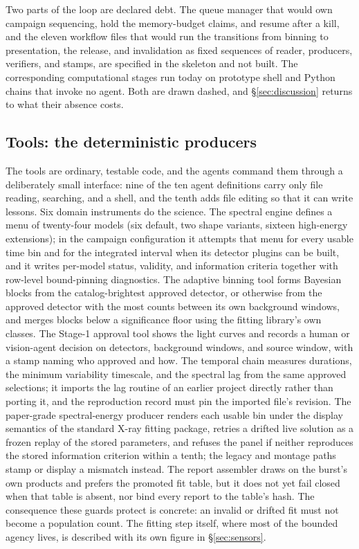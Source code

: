 Two parts of the loop are declared debt. The queue manager that would own
campaign sequencing, hold the memory-budget claims, and resume after a
kill, and the eleven workflow files\prov{} that would run the transitions
from binning to presentation, the release, and invalidation as fixed
sequences of reader, producers, verifiers, and stamps, are specified in the
skeleton and not built. The corresponding computational stages run today on
prototype shell and Python chains that invoke no agent. Both are drawn
dashed, and \S\ref{sec:discussion} returns to what their absence costs.

\subsection{Tools: the deterministic producers} \label{sec:tools}

The tools are ordinary, testable code, and the agents command them through
a deliberately small interface: nine of the ten agent definitions carry only
file reading, searching, and a shell, and the tenth adds file editing so
that it can write lessons. Six domain instruments do the science. The
spectral engine defines a menu of twenty-four models\prov{} (six default,
two shape variants, sixteen high-energy extensions); in the campaign
configuration it attempts that menu for every usable time bin and for the
integrated interval when its detector plugins can be built, and it writes
per-model status, validity, and information criteria together with
row-level bound-pinning diagnostics. The adaptive binning tool forms
Bayesian blocks from the catalog-brightest approved detector, or otherwise
from the approved detector with the most counts between its own background
windows, and merges blocks below a significance floor using the fitting
library's own classes. The Stage-1 approval tool shows the light curves and
records a human or vision-agent decision on detectors, background windows,
and source window, with a stamp naming who approved and how. The temporal
chain measures durations, the minimum variability timescale, and the
spectral lag from the same approved selections; it imports the lag routine
of an earlier project directly rather than porting it, and the reproduction
record must pin the imported file's revision. The paper-grade
spectral-energy producer renders each usable bin under the display
semantics of the standard X-ray fitting package, retries a drifted live
solution as a frozen replay of the stored parameters, and refuses the panel
if neither reproduces the stored information criterion within a tenth; the
legacy and montage paths stamp or display a mismatch instead. The report
assembler draws on the burst's own products and prefers the promoted fit
table, but it does not yet fail closed when that table is absent, nor bind
every report to the table's hash. The consequence these guards protect is
concrete: an invalid or drifted fit must not become a population count.
The fitting step itself, where most of the bounded agency lives, is
described with its own figure in \S\ref{sec:sensors}.

